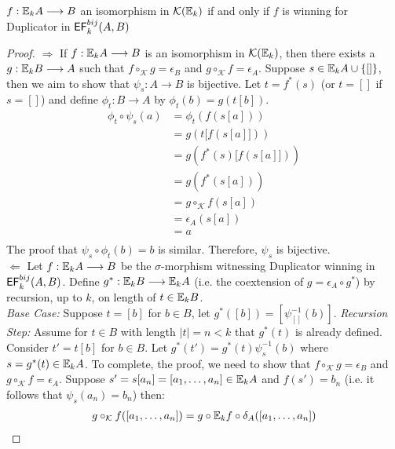 \begin{prop}
$f:{\mathbb{E}_{k}A} \longrightarrow B$ an isomorphism in $\mathcal{K}({\mathbb{E}_{k}})$ if and only if $f$ is winning for Duplicator in ${\mathsf{EF}^{bij}_{k}(A,B)}$  
\begin{proof}
$\Rightarrow$ If $f:{\mathbb{E}_{k}A} \longrightarrow B$ is an isomorphism in $\mathcal{K}({\mathbb{E}_{k}})$, then there exists a $g:{\mathbb{E}_{k}B} \longrightarrow A$ such that $f \circ_{\mathcal{K}} g = \epsilon_{B}$ and $g \circ_{\mathcal{K}} f = \epsilon_{A}$. Suppose $s \in {\mathbb{E}_{k}A} \cup \{[]\}$, then we aim to show that $\psi_{s}:A \longrightarrow B$ is bijective. Let $t = f^{*}(s)$ (or $t = []$ if $s = []$) and define $\phi_{t}:B \longrightarrow A$ by $\phi_{t}(b) = g(t[b])$.   
\begin{align*}
\phi_{t} \circ \psi_{s}(a) &= \phi_{t}(f(s[a])) \\
&= g(t[f(s[a]])) \\
&= g(f^{*}(s)[f(s[a]])) \\
&= g(f^{*}(s[a])) \\
&= g \circ_{\mathcal{K}} f(s[a]) \\
&= \epsilon_{A}(s[a]) \\
&= a \\
\end{align*}
The proof that $\psi_{s} \circ \phi_{t}(b) = b$ is similar. Therefore, $\psi_{s}$ is bijective. \\
$\Leftarrow$ Let $f:{\mathbb{E}_{k}A} \longrightarrow B$ be the $\sigma$-morphism witnessing Duplicator winning in ${\mathsf{EF}^{bij}_{k}(A,B)}$. Define $g^{*}:{\mathbb{E}_{k}B} \longrightarrow {\mathbb{E}_{k}A}$ (i.e. the coextension of $g = \epsilon_{A} \circ g^{*}$) by recursion, up to $k$, on length of $t \in {\mathbb{E}_{k}B}$. \\   
\textit{Base Case:} Suppose $t = [b]$ for $b \in B$, let $g^{*}([b]) = [\psi_{[]}^{-1}(b)]$.
\textit{Recursion Step:} Assume for $t \in B$ with length $|t| = n < k$ that $g^{*}(t)$ is already defined. Consider $t' = t[b]$ for $b \in B$. Let $g^{*}(t') = g^{*}(t)\psi_{s}^{-1}(b)$ where $s = g^{*}(t) \in {\mathbb{E}_{k}A}$. To complete, the proof, we need to show that $f \circ_{\mathcal{K}} g = \epsilon_{B}$ and $g \circ_{\mathcal{K}} f = \epsilon_{A}$. Suppose $s' = s[a_{n}] = [a_{1},\dots,a_{n}] \in {\mathbb{E}_{k}A}$ and $f(s') = b_{n}$ (i.e. it follows that $\psi_{s}(a_{n}) = b_{n}$) then: 
\begin{align*}
g \circ_{\mathcal{K}} f([a_{1},\dots,a_{n}]) &= g \circ \efcomonad{k}{f} \circ \delta_{A}([a_{1},\dots,a_{n}]) \\ 

\end{align*}
\end{proof}
\end{prop}
